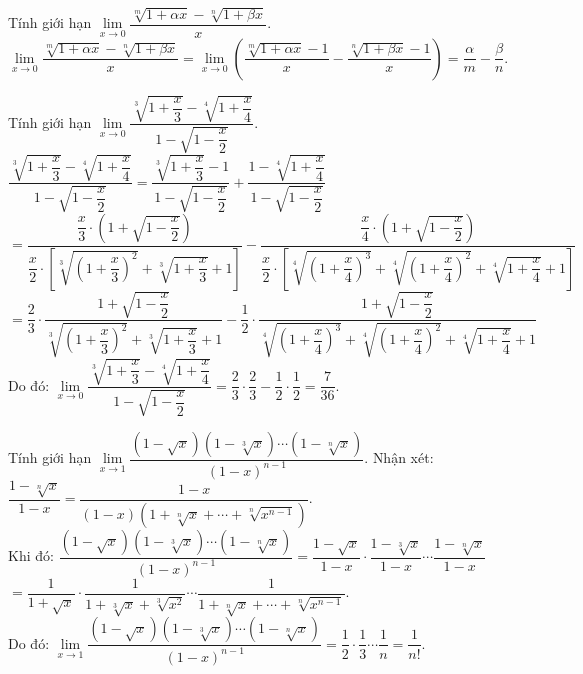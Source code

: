\begin{bt}%
Tính giới hạn $\lim\limits_{x \to 0}\dfrac{\sqrt[m]{1 + \alpha x} - \sqrt[n]{1 + \beta x}}{x}$.
\loigiai
{
$\lim\limits_{x \to 0}\dfrac{\sqrt[m]{1 + \alpha x} - \sqrt[n]{1 + \beta x}}{x} = \lim\limits_{x \to 0}\left(\dfrac{\sqrt[m]{1 + \alpha x} - 1}{x} - \dfrac{\sqrt[n]{1 + \beta x} - 1}{x}\right) = \dfrac{\alpha}{m} - \dfrac{\beta}{n}$.
}
\end{bt}


\begin{bt}%
Tính giới hạn $\lim\limits_{x \to 0}\dfrac{\sqrt[3]{1 + \dfrac{x}{3}} - \sqrt[4]{1 + \dfrac{x}{4}}}{1 - \sqrt{1 - \dfrac{x}{2}}}$.
\loigiai
{
$\dfrac{\sqrt[3]{1 + \dfrac{x}{3}} - \sqrt[4]{1 + \dfrac{x}{4}}}{1 - \sqrt{1 - \dfrac{x}{2}}} = \dfrac{\sqrt[3]{1 + \dfrac{x}{3}} - 1}{1 - \sqrt{1 - \dfrac{x}{2}}} + \dfrac{1 - \sqrt[4]{1 + \dfrac{x}{4}}}{1 - \sqrt{1 - \dfrac{x}{2}}}$\\
$= \dfrac{\dfrac{x}{3} \cdot \left(1 + \sqrt{1 - \dfrac{x}{2}}\right)}{\dfrac{x}{2} \cdot \left[\sqrt[3]{\left(1 + \dfrac{x}{3}\right)^2} + \sqrt[3]{1 + \dfrac{x}{3}} + 1\right]} - \dfrac{\dfrac{x}{4} \cdot \left(1 + \sqrt{1 - \dfrac{x}{2}}\right)}{\dfrac{x}{2} \cdot \left[\sqrt[4]{\left(1 + \dfrac{x}{4}\right)^3} + \sqrt[4]{\left(1 + \dfrac{x}{4}\right)^2} + \sqrt[4]{1 + \dfrac{x}{4}} + 1\right]}$\\
$= \dfrac{2}{3} \cdot \dfrac{1 + \sqrt{1 - \dfrac{x}{2}}}{\sqrt[3]{\left(1 + \dfrac{x}{3}\right)^2} + \sqrt[3]{1 + \dfrac{x}{3}} + 1} - \dfrac{1}{2} \cdot \dfrac{1 + \sqrt{1 - \dfrac{x}{2}}}{\sqrt[4]{\left(1 + \dfrac{x}{4}\right)^3} + \sqrt[4]{\left(1 + \dfrac{x}{4}\right)^2} + \sqrt[4]{1 + \dfrac{x}{4}} + 1}$\\
Do đó: $\lim\limits_{x \to 0}\dfrac{\sqrt[3]{1 + \dfrac{x}{3}} - \sqrt[4]{1 + \dfrac{x}{4}}}{1 - \sqrt{1 - \dfrac{x}{2}}} = \dfrac{2}{3} \cdot \dfrac{2}{3} - \dfrac{1}{2} \cdot \dfrac{1}{2} = \dfrac{7}{36}$.
}
\end{bt}


\begin{bt}%
Tính giới hạn $\lim\limits_{x \to 1}\dfrac{(1 - \sqrt{x})(1 - \sqrt[3]{x}) \cdots (1 - \sqrt[n]{x})}{(1-x)^{n-1}}$.
\loigiai
{
Nhận xét: $\dfrac{1 - \sqrt[n]{x}}{1-x} = \dfrac{1-x}{(1-x)\left(1 + \sqrt[n]{x} + \cdots + \sqrt[n]{x^{n-1}}\right)}$.\\
Khi đó: $\dfrac{(1 - \sqrt{x})(1 - \sqrt[3]{x}) \cdots (1 - \sqrt[n]{x})}{(1-x)^{n-1}} = \dfrac{1 - \sqrt{x}}{1-x} \cdot \dfrac{1 - \sqrt[3]{x}}{1-x} \cdots \dfrac{1 - \sqrt[n]{x}}{1-x}$\\
$= \dfrac{1}{1 + \sqrt{x}} \cdot \dfrac{1}{1 + \sqrt[3]{x} + \sqrt[3]{x^2}} \cdots \dfrac{1}{1 + \sqrt[n]{x} + \cdots + \sqrt[n]{x^{n-1}}}$.\\
Do đó: $\lim\limits_{x \to 1}\dfrac{(1 - \sqrt{x})(1 - \sqrt[3]{x}) \cdots (1 - \sqrt[n]{x})}{(1-x)^{n-1}} = \dfrac{1}{2} \cdot \dfrac{1}{3} \cdots \dfrac{1}{n} = \dfrac{1}{n!}$.
}
\end{bt}



